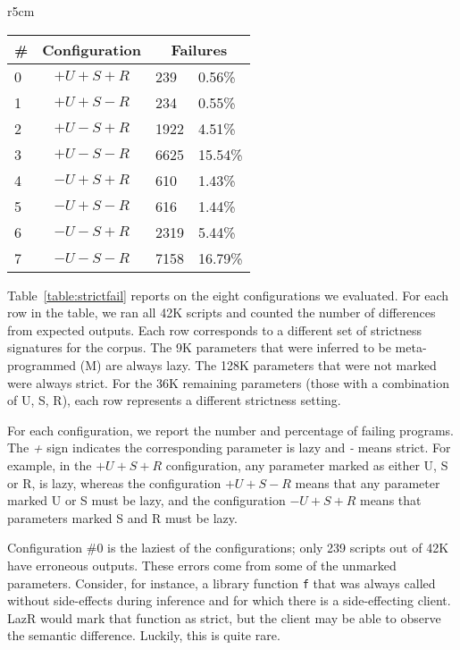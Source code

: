 \documentclass[review,nonacm,screen,acmsmall,anonymous=true]{acmart}
\renewcommand{\c}[1]{\lstinline |#1|\xspace}
\newcommand{\lazr}{{\sf LazR}\xspace}
\newcommand{\cconfig}[1]{Configuration \#{#1}}
\begin{document}
\begin{wraptable}{r}{5cm}
  \small
  \caption{Strictness Failure} \label{table:strictfail}
  \centering
  \begin{tabular}{lc|ll}
    \toprule
    \#&\textbf{Configuration}&\multicolumn{2}{c}{\textbf{Failures}}\\
    \midrule
    0&$+U+S+R$&239&0.56\%\\
    1&$+U+S-R$&234&0.55\%\\
    2&$+U-S+R$&1922&4.51\%\\
    3&$+U-S-R$&6625&15.54\%\\
    4&$-U+S+R$&610&1.43\%\\
    5&$-U+S-R$&616&1.44\%\\
    6&$-U-S+R$&2319&5.44\%\\
    7&$-U-S-R$&7158&16.79\%\\
    \bottomrule
  \end{tabular}
\end{wraptable}

Table~\ref{table:strictfail} reports on the eight configurations we evaluated.
For each row in the table, we ran all 42K scripts and counted the number of
differences from expected outputs. Each row corresponds to a different set of
strictness signatures for the corpus. The 9K parameters that were inferred to be
meta-programmed (M) are always lazy. The 128K parameters that were not marked
were always strict. For the 36K remaining parameters (those with a combination
of U, S, R), each row represents a different strictness setting.

For each configuration, we report the number and percentage of failing programs.
The \emph{+} sign indicates the corresponding parameter is lazy and \emph{-}
means strict. For example, in the $+U+S+R$ configuration, any parameter marked
as either U, S or R, is lazy, whereas the configuration $+U+S-R$ means that any
parameter marked U or S must be lazy, and the configuration $-U+S+R$ means that
parameters marked S and R must be lazy.

\cconfig 0 is the laziest of the configurations; only 239 scripts out of 42K
have erroneous outputs. These errors come from some of the
unmarked parameters. Consider, for instance, a library function \c f that was
always called without side-effects during inference and for which there is a
side-effecting client. \lazr would mark that function as strict, but the client
may be able to observe the semantic difference. Luckily, this is quite rare.
\end{document}
